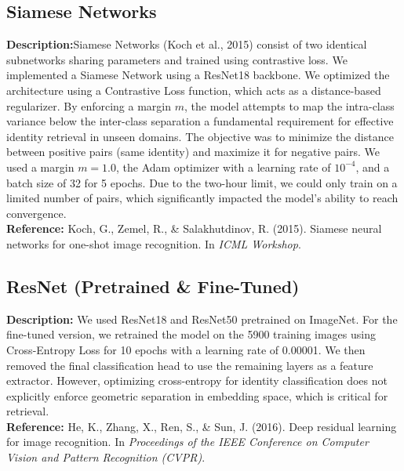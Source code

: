 \documentclass[10pt,twocolumn,letterpaper]{article}
\begin{document}
\subsection{Siamese Networks}
\textbf{Description:}Siamese Networks (Koch et al., 2015) consist of two identical subnetworks sharing parameters and trained using contrastive loss. We implemented a Siamese Network using a ResNet18 backbone. We optimized the architecture using a Contrastive Loss function, which acts as a distance-based regularizer. By enforcing a margin $m$, the model attempts to map the intra-class variance below the inter-class separation a fundamental requirement for effective identity retrieval in unseen domains. The objective was to minimize the distance between positive pairs (same identity) and maximize it for negative pairs. We used a margin $m=1.0$, the Adam optimizer with a learning rate of $10^{-4}$, and a batch size of 32 for 5 epochs. Due to the two-hour limit, we could only train on a limited number of pairs, which significantly impacted the model's ability to reach convergence.\\

\textbf{Reference:} Koch, G., Zemel, R., \& Salakhutdinov, R. (2015). Siamese neural networks for one-shot image recognition. In \textit{ICML Workshop}.
\subsection{ResNet (Pretrained \& Fine-Tuned)}
\textbf{Description:} We used ResNet18 and ResNet50 pretrained on ImageNet. For the fine-tuned version, we retrained the model on the 5900 training images using Cross-Entropy Loss for 10 epochs with a learning rate of 0.00001. We then removed the final classification head to use the remaining layers as a feature extractor. However, optimizing cross-entropy for identity classification does not explicitly enforce geometric separation in embedding space, which is critical for retrieval.\\

\textbf{Reference:} He, K., Zhang, X., Ren, S., \& Sun, J. (2016). Deep residual learning for image recognition. In \textit{Proceedings of the IEEE Conference on Computer Vision and Pattern Recognition (CVPR)}.
\end{document}
